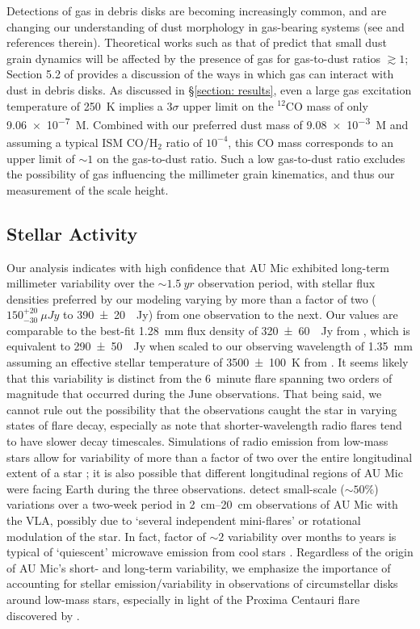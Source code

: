 \documentclass[modern]{aastex62}
\begin{document}
Detections of gas in debris disks are becoming increasingly common, and are changing our understanding of dust morphology in gas-bearing systems (see \citealp{hughes18} and references therein).
Theoretical works such as that of \citet{takeuchi&artymowcz01} predict that small dust grain dynamics will be affected by the presence of gas for gas-to-dust ratios $\gtrsim 1$; Section 5.2 of \citet{hughes17} provides a discussion of the ways in which gas can interact with dust in debris disks.
As discussed in \S \ref{section: results}, even a large gas excitation temperature of \SI{250}{K} implies a $3 \sigma$ upper limit on the $^{12}$CO mass of only \SI{9.06e-7}{M_\earth}. 
Combined with our preferred dust mass of \SI{9.08e-3}{M_\earth} and assuming a typical ISM CO/H$_2$ ratio of $10^{-4}$, this CO mass corresponds to an upper limit of $\sim 1$ on the gas-to-dust ratio.
Such a low gas-to-dust ratio excludes the possibility of gas influencing the millimeter grain kinematics, and thus our measurement of the scale height.

\subsection{Stellar Activity}
\label{subsection: stellar activity}

Our analysis indicates with high confidence that AU Mic exhibited long-term millimeter variability over the $\sim \SI{1.5}{yr}$ observation period, with stellar
flux densities preferred by our modeling varying by more than a factor of two ($150^{+20}_{-30}~\si{\mu Jy}$ to \SI{390 \pm 20}{\mu Jy}) from one observation to the next.
Our values are comparable to the best-fit \SI{1.28}{mm} flux density of \SI{320 \pm 60}{\mu Jy} from \citet{macgregor13}, which is equivalent to \SI{290 \pm 50}{\mu Jy} when scaled to our observing wavelength of \SI{1.35}{mm} assuming an effective stellar temperature of \SI{3500 \pm 100}{K} from \citet{plavchan09}.
It seems likely that this variability is distinct from the \SI{6}{minute} flare spanning two orders of magnitude that occurred during the June observations. 
That being said, we cannot rule out the possibility that the observations caught the star in varying states of flare decay, especially as \citet{white96} note that shorter-wavelength radio flares tend to have slower decay timescales.
Simulations of radio emission from low-mass stars allow for variability of more than a factor of two over the entire longitudinal extent of a star \citep{llama18}; it is also possible that different longitudinal regions of AU Mic were facing Earth during the three observations.
\citet{cox85} detect small-scale ($\sim 50\%$) variations over  a two-week period in \SIrange{2}{20}{cm} observations of AU Mic with the VLA, possibly due to `several independent mini-flares' or rotational modulation of the star.
In fact, factor of $\sim 2$ variability over months to years is typical of `quiescent' microwave emission from cool stars \citep{guedel94}.
Regardless of the origin of AU Mic's short- and long-term variability, we emphasize the importance of accounting for stellar emission/variability in observations of circumstellar disks around low-mass stars, especially in light of the Proxima Centauri flare discovered by \citet{macgregor18}.
\end{document}
